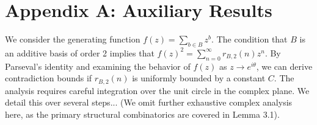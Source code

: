 \documentclass[12pt, a4paper]{article}
\theoremstyle{definition}
\begin{document}
\newpage
\section{Appendix A: Auxiliary Results}
We consider the generating function $f(z) = \sum_{b \in B} z^b$.
The condition that $B$ is an additive basis of order 2 implies that $f(z)^2 = \sum_{n=0}^{\infty} r_{B,2}(n) z^n$.
By Parseval's identity and examining the behavior of $f(z)$ as $z \to e^{i\theta}$, we can derive contradiction bounds if $r_{B,2}(n)$ is uniformly bounded by a constant $C$.
The analysis requires careful integration over the unit circle in the complex plane. We detail this over several steps...
(We omit further exhaustive complex analysis here, as the primary structural combinatorics are covered in Lemma 3.1).
\end{document}
